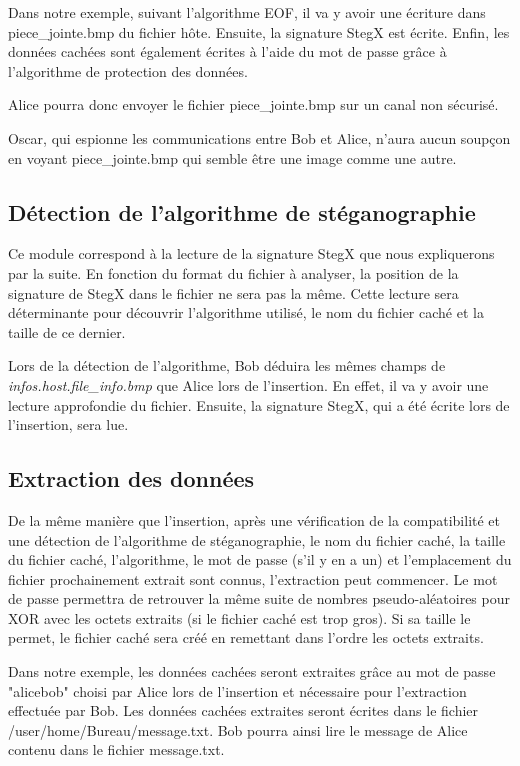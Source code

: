 \documentclass[11pt]{article}
\begin{document}
Dans notre exemple, suivant l'algorithme EOF, il va y avoir une écriture 
dans piece\_jointe.bmp du fichier hôte. 
Ensuite, la signature StegX est écrite. 
Enfin, les données cachées sont également écrites à l'aide du mot de passe
grâce à l'algorithme de protection des données. 

Alice pourra donc envoyer le fichier piece\_jointe.bmp sur un canal non 
sécurisé. 

Oscar, qui espionne les communications entre Bob et Alice, n'aura aucun 
soupçon en voyant piece\_jointe.bmp qui semble être une image comme une 
autre. 

\subsection{Détection de l'algorithme de stéganographie}

Ce module correspond à la lecture de la signature StegX que nous expliquerons 
par la suite. En fonction du format
du fichier à analyser, la position de la signature de StegX dans le fichier ne
sera pas la même. Cette lecture sera déterminante pour découvrir l'algorithme
utilisé, le nom du fichier caché et la taille de ce dernier. 

Lors de la détection de l'algorithme, Bob déduira les mêmes champs de 
\textit{infos.host.file\_info.bmp} que Alice lors de l'insertion. En effet, 
il va y avoir une lecture approfondie du fichier. Ensuite, la signature 
StegX, qui a été écrite lors de l'insertion, sera lue.

\subsection{Extraction des données}

De la même manière que l'insertion, 
après une vérification de la compatibilité et une détection de l'algorithme 
de stéganographie, le nom du fichier caché, la taille du fichier caché, 
l'algorithme, le mot de passe (s'il y en a un) et l'emplacement du fichier 
prochainement extrait sont connus, l'extraction peut commencer. 
Le mot de passe permettra de retrouver la même suite de nombres pseudo-aléatoires 
pour XOR avec les octets extraits (si le fichier caché est trop gros). 
Si sa taille le permet, le fichier caché sera créé en remettant dans l'ordre 
les octets extraits. 

Dans notre exemple, les données cachées seront extraites grâce au mot de passe 
"alicebob" choisi par Alice lors de l'insertion et nécessaire pour l'extraction 
effectuée par Bob. 
Les données cachées extraites seront écrites dans le fichier
/user/home/Bureau/message.txt. Bob pourra ainsi lire le message de Alice 
contenu dans le fichier message.txt. 
\end{document}
